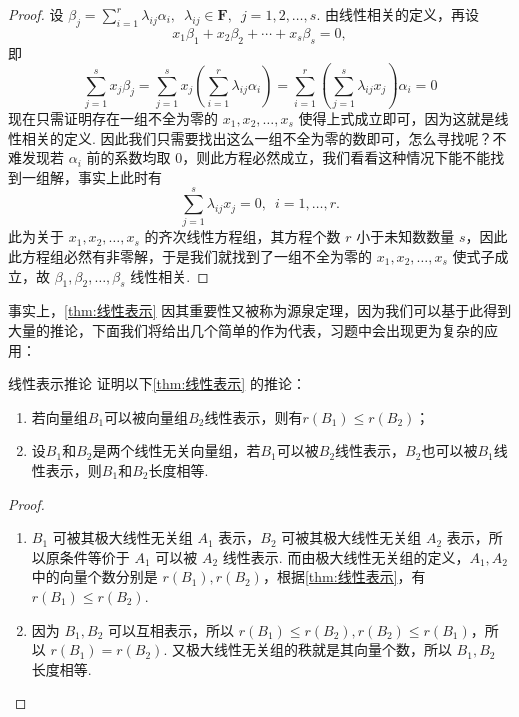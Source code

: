 \begin{proof}
    设 $\beta_j = \displaystyle\sum_{i = 1}^r \lambda_{ij} \alpha_i,\enspace \lambda_{ij} \in \mathbf{F},\enspace j = 1, 2, \ldots, s$. 由线性相关的定义，再设
    \[x_1\beta_1 + x_2\beta_2 + \cdots + x_s\beta_s = 0,\]
    即
    \[\sum_{j = 1}^s x_j\beta_j = \sum_{j = 1}^s x_j\left(\sum_{i = 1}^r \lambda_{ij} \alpha_i\right) = \sum_{i = 1}^r \left(\sum_{j = 1}^s \lambda_{ij}x_j\right)\alpha_i = 0\]
    现在只需证明存在一组不全为零的 $x_1, x_2, \ldots, x_s$ 使得上式成立即可，因为这就是线性相关的定义. 因此我们只需要找出这么一组不全为零的数即可，怎么寻找呢？不难发现若 $\alpha_i$ 前的系数均取 0，则此方程必然成立，我们看看这种情况下能不能找到一组解，事实上此时有
    \[\sum_{j = 1}^s \lambda_{ij}x_j = 0,\enspace i = 1, \ldots, r.\]
    此为关于 $x_1, x_2, \ldots, x_s$ 的齐次线性方程组，其方程个数 $r$ 小于未知数数量 $s$，因此此方程组必然有非零解，于是我们就找到了一组不全为零的 $x_1, x_2, \ldots, x_s$ 使式子成立，故 $ \beta_1,\beta_2,\ldots,\beta_s $ 线性相关.
\end{proof}

事实上，\autoref{thm:线性表示} 因其重要性又被称为源泉定理，因为我们可以基于此得到大量的推论，下面我们将给出几个简单的作为代表，习题中会出现更为复杂的应用：
\begin{example}{}{线性表示推论}
    证明以下\autoref*{thm:线性表示} 的推论：
    \begin{enumerate}[label=(\arabic*)]
        \item 若向量组$B_1$可以被向量组$B_2$线性表示，则有$r(B_1)\leqslant r(B_2)$；

        \item \label{item:3:线性表示推论:2}
              设$B_1$和$B_2$是两个线性无关向量组，若$B_1$可以被$B_2$线性表示，$B_2$也可以被$B_1$线性表示，则$B_1$和$B_2$长度相等.
    \end{enumerate}
\end{example}

\begin{proof}
    \begin{enumerate}
        \item $B_1$ 可被其极大线性无关组 $A_1$ 表示，$B_2$ 可被其极大线性无关组 $A_2$ 表示，所以原条件等价于 $A_1$ 可以被 $A_2$ 线性表示. 而由极大线性无关组的定义，$A_1, A_2$ 中的向量个数分别是 $r(B_1), r(B_2)$，根据\autoref{thm:线性表示}，有 $r(B_1)\leqslant r(B_2)$.

        \item 因为 $B_1, B_2$ 可以互相表示，所以 $r(B_1) \leqslant r(B_2),r(B_2) \leqslant r(B_1)$，所以 $r(B_1) = r(B_2)$. 又极大线性无关组的秩就是其向量个数，所以 $B_1, B_2$ 长度相等.
    \end{enumerate}
\end{proof}

